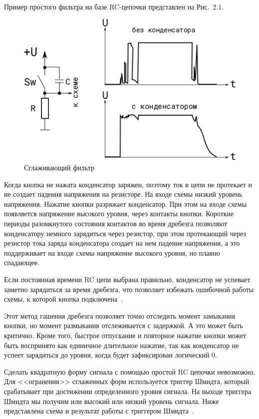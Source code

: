 \documentclass{altsu-report}
\begin{document}
Пример простого фильтра на базе RC-цепочки представлен на Рис.~2.1.

\begin{figure}[H]
    \centering
    \includegraphics{capasitor.png}
    \caption{Сглаживающий фильтр}
    \label{fig:capasitor}
\end{figure}

Когда кнопка не нажата конденсатор заряжен, поэтому ток в цепи не протекает и не создает падения напряжения на резисторе. На входе схемы низкий уровень напряжения. Нажатие кнопки разряжает конденсатор. При этом на входе схемы появляется напряжение высокого уровня, через контакты кнопки. Короткие периоды разомкнутого состояния контактов во время дребезга позволяют конденсатору немного зарядиться через резистор, при этом протекающий через резистор тока заряда конденсатора создает на нем падение напряжения, а это поддерживает на входе схемы напряжение высокого уровня, но плавно спадающее.

Если постоянная времени RC цепи выбрана правильно, конденсатор не успевает заметно зарядиться за время дребезга, что позволяет избежать ошибочной работы схемы, к которой кнопка подключена~\cite{asutpp}.

Этот метод гашения дребезга позволяет точно отследить момент замыкания кнопки, но момент размыкания отслеживается с задержкой. А это может быть критично. Кроме того, быстрое отпускание и повторное нажатие кнопки может быть воспринято как единичное длительное нажатие, так как конденсатор не успеет зарядиться до уровня, когда будет зафиксирован логический 0.

Сделать квадратную форму сигнала с помощью простой RC цепочки невозможно. Для <<огранения>> сглаженных форм используется триггер Шмидта, который срабатывает при достижении определенного уровня сигнала. На выходе триггера Шмидта мы получим или высокий или низкий уровень сигнала. Ниже представлена схема и результат работы с триггером Шмидта~\cite{arduino}.
\end{document}
